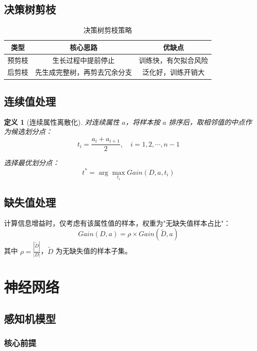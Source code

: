 \documentclass[12pt,a4paper]{ctexart}
\newtheorem{definition}{定义}[section]
\begin{document}
\subsection{决策树剪枝}

\begin{table}[H]
\centering
\caption{决策树剪枝策略}
\begin{tabular}{ccc}
\toprule
\textbf{类型} & \textbf{核心思路} & \textbf{优缺点} \\
\midrule
预剪枝 & 生长过程中提前停止 & 训练快，有欠拟合风险 \\
后剪枝 & 先生成完整树，再剪去冗余分支 & 泛化好，训练开销大 \\
\bottomrule
\end{tabular}
\end{table}

\subsection{连续值处理}

\begin{definition}[连续属性离散化]
对连续属性 $a$，将样本按 $a$ 排序后，取相邻值的中点作为候选划分点：
\[
t_i = \frac{a_i + a_{i+1}}{2}, \quad i = 1, 2, \cdots, n-1
\]

选择最优划分点：
\[
t^* = \arg\max_{t_i} Gain(D, a, t_i)
\]
\end{definition}

\subsection{缺失值处理}

计算信息增益时，仅考虑有该属性值的样本，权重为"无缺失值样本占比"：
\[
Gain(D, a) = \rho \times Gain(\tilde{D}, a)
\]
其中 $\rho = \frac{|\tilde{D}|}{|D|}$，$\tilde{D}$ 为无缺失值的样本子集。


\section{神经网络}

\subsection{感知机模型}

\subsubsection{核心前提}
\end{document}
